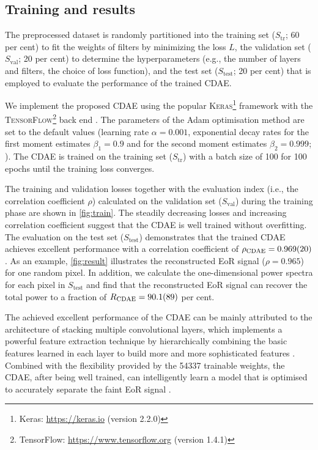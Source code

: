 \documentclass[fleqn,usenatbib]{mnras}
\newcommand{\R}[1]{\mathrm{#1}}
\begin{document}
\subsection{Training and results}
\label{sec:training}

The preprocessed dataset is randomly partitioned into
the training set ($S_{\R{tr}}$; 60 per cent) to fit the weights of
filters by minimizing the loss $L$,
the validation set ($S_{\R{val}}$; 20 per cent) to determine the
hyperparameters (e.g., the number of layers and filters, the choice of
loss function),
and the test set ($S_{\R{test}}$; 20 per cent) that is employed to
evaluate the performance of the trained CDAE.

We implement the proposed CDAE using the popular \textsc{Keras}\footnote{%
  Keras: \url{https://keras.io} (version 2.2.0)}
framework \citep{keras} with the \textsc{TensorFlow}\footnote{%
TensorFlow: \url{https://www.tensorflow.org} (version 1.4.1)}
back end \citep{tensorflow}.
The parameters of the Adam optimisation method are set to the default
values (learning rate $\alpha = 0.001$, exponential decay rates for the
first moment estimates $\beta_1 = 0.9$ and for the second moment
estimates $\beta_2 = 0.999$; \citealt{kingma2015}).
The CDAE is trained on the training set ($S_{\R{tr}}$) with a batch size
of 100 for 100 epochs until the training loss converges.

The training and validation losses together with the evaluation index
(i.e., the correlation coefficient $\rho$) calculated on the validation set
($S_{\R{val}}$) during the training phase are shown in \autoref{fig:train}.
The steadily decreasing losses and increasing correlation coefficient
suggest that the CDAE is well trained without overfitting.
The evaluation on the test set ($S_{\R{test}}$) demonstrates that the
trained CDAE achieves excellent performance with a correlation
coefficient of $\rho_{\R{CDAE}} = \num{0.969 +- 0.020}$.
As an example, \autoref{fig:result} illustrates the reconstructed EoR
signal ($\rho = 0.965$) for one random pixel.
In addition, we calculate the one-dimensional power spectra for each
pixel in $S_{\R{test}}$ \citep[e.g.,][]{chapman2013}
and find that the reconstructed EoR signal can recover the total power
to a fraction of $R_{\R{CDAE}} = \num{90.1 +- 8.9}$ per cent.

The achieved excellent performance of the CDAE can be mainly attributed
to the architecture of stacking multiple convolutional layers, which
implements a powerful feature extraction technique by hierarchically
combining the basic features learned in each layer to build more and
more sophisticated features \citep{lecun2015}.
Combined with the flexibility provided by the \num{54337} trainable
weights, the CDAE, after being well trained, can intelligently learn a
model that is optimised to accurately separate the faint EoR signal
\citep[e.g.,][]{domingos2012}.
\end{document}
